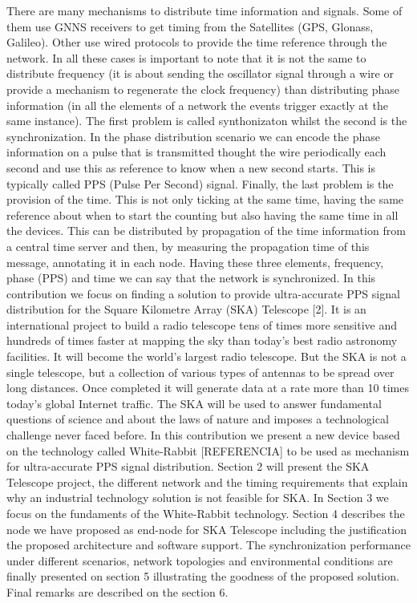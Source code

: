 \documentclass[review]{elsarticle}
\begin{document}
There are many mechanisms to distribute time information and signals. Some of them use GNNS receivers to get timing from the Satellites (GPS, Glonass, Galileo). Other use wired protocols to provide the time reference through the network. In all these cases is important to note that it is not the same to distribute frequency (it is about sending the oscillator signal through a wire or provide a mechanism to regenerate the clock frequency) than distributing phase information (in all the elements of a network the events trigger exactly at the same instance). The first problem is called synthonizaton whilst the second is the synchronization. In the phase distribution scenario we can encode the phase information on a pulse that is transmitted thought the wire periodically each second and use this as reference to know when a new second starts. This is typically called PPS (Pulse Per Second) signal. Finally, the last problem is the provision of the time. This is not only ticking at the same time, having the same reference about when to start the counting but also having the same time in all the devices. This can be distributed by propagation of the time information from a central time server and then, by measuring the propagation time of this message, annotating it in each node. Having these three elements, frequency, phase (PPS) and time we can say that the network is synchronized.
In this contribution we focus on finding a solution to provide ultra-accurate PPS signal distribution for the Square Kilometre Array (SKA) Telescope [2]. It is an international project to build a radio telescope tens of times more sensitive and hundreds of times faster at mapping the sky than today’s best radio astronomy facilities. It will become the world’s largest radio telescope. But the SKA is not a single telescope, but a collection of various types of antennas to be spread over long distances. Once completed it will generate data at a rate more than 10 times today’s global Internet traffic. The SKA will be used to answer fundamental questions of science and about the laws of nature and imposes a technological challenge never faced before. 
In this contribution we present a new device based on the technology called White-Rabbit [REFERENCIA] to be used as mechanism for ultra-accurate PPS signal distribution. Section 2 will present the SKA Telescope project, the different network and the timing requirements that explain why an industrial technology solution is not feasible for SKA. In Section 3 we focus on the fundaments of the White-Rabbit technology. Section 4 describes the node we have proposed as end-node for SKA Telescope including the justification the proposed architecture and software support. The synchronization performance under different scenarios, network topologies and environmental conditions are finally presented on section 5 illustrating the goodness of the proposed solution. Final remarks are described on the section 6. 
\end{document}
